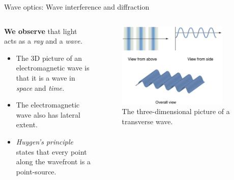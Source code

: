 \documentclass{beamer}
\begin{document}
\begin{frame}{Wave optics: Wave interference and diffraction}
\begin{columns}[T]
\begin{column}{0.5\textwidth}
\small
\textbf{We observe} that light acts as a \textit{ray} and a \textit{wave.}
\begin{itemize}
\item The 3D picture of an electromagnetic wave is that it is a wave in \textit{space} and \textit{time.}
\item The electromagnetic wave also has lateral extent.
\item \textit{Huygen's principle} states that every point along the wavefront is a point-source.
\end{itemize}
\end{column}
\begin{column}{0.5\textwidth}
\begin{figure}
\centering
\includegraphics[width=0.85\textwidth]{figures/wave1.png}
\caption{\label{fig:wave1} \footnotesize The three-dimensional picture of a transverse wave.}
\end{figure}
\end{column}
\end{columns}
\end{frame}
\end{document}
